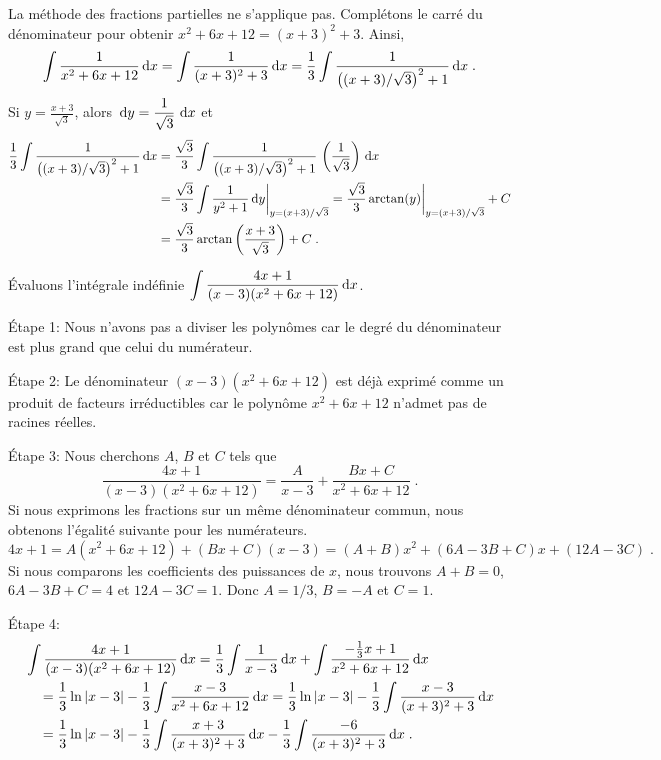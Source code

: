 {\begin{egg}
La méthode des fractions partielles ne s'applique pas.  Complétons le
carré du dénominateur pour obtenir $x^2+6x+12 = (x+3)^2 + 3$.
Ainsi,
\[
\int \frac{1}{x^2+6x+12} \,\mathrm{d}x = \int \frac{1}{(x+3)^2 + 3} \,\mathrm{d}x
= \frac{1}{3} \int \frac{1}{ \left((x+3)/\sqrt{3}\right)^2 + 1} \,\mathrm{d}x \; .
\]
Si $\displaystyle y=\frac{x+3}{\sqrt{3}}$, alors
$\displaystyle \,\mathrm{d}y = \frac{1}{\sqrt{3}} \, \,\mathrm{d}x$ et
\begin{align*}
\frac{1}{3} \int \frac{1}{ \left((x+3)/\sqrt{3}\right)^2 + 1} \,\mathrm{d}x
&= \frac{\sqrt{3}}{3} \int \frac{1}{\left((x+3)/\sqrt{3}\right)^2 + 1}
\,\left(\frac{1}{\sqrt{3}}\right)\,\mathrm{d}x \\
&= \frac{\sqrt{3}}{3}\int \frac{1}{y^2 + 1} \,\mathrm{d}y\bigg|_{y=(x+3)/\sqrt{3}}
= \frac{\sqrt{3}}{3} \arctan(y)\bigg|_{y=(x+3)/\sqrt{3}} + C \\
&= \frac{\sqrt{3}}{3} \arctan\left(\frac{x+3}{\sqrt{3}}\right) + C \; .
\end{align*}
\label{no_part_frac}
\end{egg}

\begin{egg}[\eng]
Évaluons l'intégrale indéfinie 
$\displaystyle \int \frac{4x+1}{(x-3)(x^2+6x+12)}  \,\mathrm{d}x$.

Étape 1: Nous n'avons pas a diviser les polynômes car le degré du
dénominateur est plus grand que celui du numérateur.

Étape 2: Le dénominateur $(x-3)(x^2+6x+12)$ est déjà exprimé comme un
produit de facteurs irréductibles car le polynôme $x^2+6x+12$ n'admet
pas de racines réelles.

Étape 3: Nous cherchons $A$, $B$ et $C$ tels que
\[
\frac{4x+1}{(x-3)(x^2+6x+12)} = \frac{A}{x-3} + \frac{Bx+C}{x^2+6x+12} \; .
\]
Si nous exprimons les fractions sur un même dénominateur commun, nous
obtenons l'égalité suivante pour les numérateurs.
\[
4x+1 = A(x^2+6x+12) + (Bx+C)(x-3) = (A+B)x^2 + (6A-3B+C)x +(12A-3C) \; .
\]
Si nous comparons les coefficients des puissances de $x$, nous trouvons
$A+B = 0$, $6A-3B+C = 4$ et $12A-3C=1$.  Donc $A= 1/3$, $B=-A$ et
$C=1$.

Étape 4:
\begin{align*}
&\int \frac{4x+1}{(x-3)(x^2+6x+12)}  \,\mathrm{d}x
= \frac{1}{3} \int \frac{1}{x-3} \,\mathrm{d}x +
\int \frac{-\frac{1}{3}x + 1}{x^2+6x+12} \,\mathrm{d}x \\
&\quad = \frac{1}{3} \ln|x-3|
- \frac{1}{3} \int \frac{x-3}{x^2+6x+12} \,\mathrm{d}x
= \frac{1}{3}\ln|x-3|
- \frac{1}{3} \int \frac{x-3}{(x+3)^2 + 3} \,\mathrm{d}x \\
&\quad = \frac{1}{3}\ln|x-3|
- \frac{1}{3} \int \frac{x+3}{(x+3)^2 + 3} \,\mathrm{d}x
- \frac{1}{3} \int \frac{-6}{(x+3)^2 + 3} \,\mathrm{d}x \; .
\end{align*}


\end{egg}}
